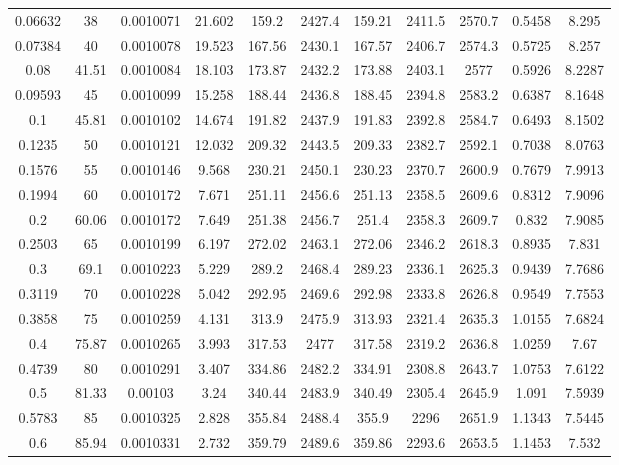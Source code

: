 \begin{longtable}{ccccccccccc}
	0.06632 & 38    & 0.0010071 & 21.602   & 159.2  & 2427.4 & 159.21 & 2411.5 & 2570.7 & 0.5458 & 8.295       \\
	0.07384 & 40    & 0.0010078 & 19.523   & 167.56 & 2430.1 & 167.57 & 2406.7 & 2574.3 & 0.5725 & 8.257       \\
	0.08    & 41.51 & 0.0010084 & 18.103   & 173.87 & 2432.2 & 173.88 & 2403.1 & 2577   & 0.5926 & 8.2287      \\
	0.09593 & 45    & 0.0010099 & 15.258   & 188.44 & 2436.8 & 188.45 & 2394.8 & 2583.2 & 0.6387 & 8.1648      \\
	0.1     & 45.81 & 0.0010102 & 14.674   & 191.82 & 2437.9 & 191.83 & 2392.8 & 2584.7 & 0.6493 & 8.1502      \\
	0.1235  & 50    & 0.0010121 & 12.032   & 209.32 & 2443.5 & 209.33 & 2382.7 & 2592.1 & 0.7038 & 8.0763      \\
	0.1576  & 55    & 0.0010146 & 9.568    & 230.21 & 2450.1 & 230.23 & 2370.7 & 2600.9 & 0.7679 & 7.9913      \\
	0.1994  & 60    & 0.0010172 & 7.671    & 251.11 & 2456.6 & 251.13 & 2358.5 & 2609.6 & 0.8312 & 7.9096      \\
	0.2     & 60.06 & 0.0010172 & 7.649    & 251.38 & 2456.7 & 251.4  & 2358.3 & 2609.7 & 0.832  & 7.9085      \\
	0.2503  & 65    & 0.0010199 & 6.197    & 272.02 & 2463.1 & 272.06 & 2346.2 & 2618.3 & 0.8935 & 7.831       \\
	0.3     & 69.1  & 0.0010223 & 5.229    & 289.2  & 2468.4 & 289.23 & 2336.1 & 2625.3 & 0.9439 & 7.7686      \\
	0.3119  & 70    & 0.0010228 & 5.042    & 292.95 & 2469.6 & 292.98 & 2333.8 & 2626.8 & 0.9549 & 7.7553      \\
	0.3858  & 75    & 0.0010259 & 4.131    & 313.9  & 2475.9 & 313.93 & 2321.4 & 2635.3 & 1.0155 & 7.6824      \\
	0.4     & 75.87 & 0.0010265 & 3.993    & 317.53 & 2477   & 317.58 & 2319.2 & 2636.8 & 1.0259 & 7.67        \\
	0.4739  & 80    & 0.0010291 & 3.407    & 334.86 & 2482.2 & 334.91 & 2308.8 & 2643.7 & 1.0753 & 7.6122      \\
	0.5     & 81.33 & 0.00103   & 3.24     & 340.44 & 2483.9 & 340.49 & 2305.4 & 2645.9 & 1.091  & 7.5939      \\
	0.5783  & 85    & 0.0010325 & 2.828    & 355.84 & 2488.4 & 355.9  & 2296   & 2651.9 & 1.1343 & 7.5445      \\
	0.6     & 85.94 & 0.0010331 & 2.732    & 359.79 & 2489.6 & 359.86 & 2293.6 & 2653.5 & 1.1453 & 7.532       \\

\end{longtable}
